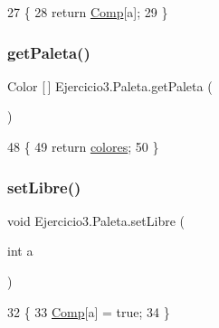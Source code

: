 \begin{DoxyCode}
27     \{
28         \textcolor{keywordflow}{return} \mbox{\hyperlink{class_ejercicio3_1_1_paleta_a1e0d32a96f88fc79dcca5cf1f5758f6b}{Comp}}[a];
29     \}
\end{DoxyCode}
\mbox{\label{class_ejercicio3_1_1_paleta_a2c27da86276ac62593e2e8e1bbfa7a12}} 
\subsubsection{\texorpdfstring{get\+Paleta()}{getPaleta()}}
{\footnotesize\ttfamily Color \mbox{[}$\,$\mbox{]} Ejercicio3.\+Paleta.\+get\+Paleta (\begin{DoxyParamCaption}{ }\end{DoxyParamCaption})\hspace{0.3cm}{\ttfamily [inline]}}


\begin{DoxyCode}
48     \{
49         \textcolor{keywordflow}{return} \mbox{\hyperlink{class_ejercicio3_1_1_paleta_ad197acb4f704b18fcf00ad02ad45b47d}{colores}};
50     \}
\end{DoxyCode}
\mbox{\label{class_ejercicio3_1_1_paleta_abd1d94b50d8ff18205c7265f3002fbb6}} 
\subsubsection{\texorpdfstring{set\+Libre()}{setLibre()}}
{\footnotesize\ttfamily void Ejercicio3.\+Paleta.\+set\+Libre (\begin{DoxyParamCaption}\item[{int}]{a }\end{DoxyParamCaption})\hspace{0.3cm}{\ttfamily [inline]}}


\begin{DoxyCode}
32     \{
33         \mbox{\hyperlink{class_ejercicio3_1_1_paleta_a1e0d32a96f88fc79dcca5cf1f5758f6b}{Comp}}[a] = \textcolor{keyword}{true};
34     \}
\end{DoxyCode}
\mbox{\label{class_ejercicio3_1_1_paleta_a0e3c5e71ab1f44028fa072043a154cd0}} 
